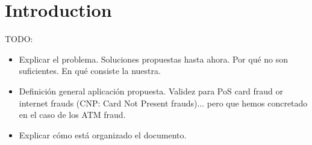 
\section{Introduction}

TODO:
\begin{itemize}
    \item Explicar el problema. Soluciones propuestas hasta ahora. Por qué no son suficientes. En qué consiste la nuestra.
    \item Definición general aplicación propuesta. Validez para PoS card fraud or internet frauds (CNP: Card Not Present frauds)... pero que hemos concretado en el caso de los ATM fraud.
    \item Explicar cómo está organizado el documento.
\end{itemize}
